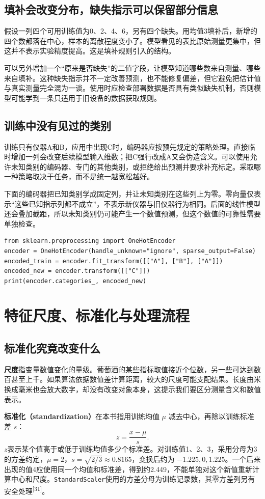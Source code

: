 \subsection{填补会改变分布，缺失指示可以保留部分信息}
假设一列四个可用训练值为0、2、4、6，另有四个缺失。用均值3填补后，新增的四个数都落在中心，样本的离散程度变小了。模型看见的表比原始测量更集中，但这并不表示实验精度提高。这是填补规则引入的结构。

可以另外增加一个“原来是否缺失”的二值字段，让模型知道哪些数来自测量、哪些来自填补。这种缺失指示并不一定改善预测，也不能修复偏差，但它避免把估计值与真实测量完全混为一谈。使用时应检查部署数据是否具有类似缺失机制，否则模型可能学到一条只适用于旧设备的数据获取规则。

\subsection{训练中没有见过的类别}
训练只有仪器A和B，应用中出现C时，编码器应按预先规定的策略处理。直接临时增加一列会改变后续模型输入维数；把C强行改成A又会伪造含义。可以使用允许未知类别的编码器、专门的其他类别，或拒绝给出预测并要求补充标定。采取哪一种策略取决于任务，而不是统一越宽松越好。

下面的编码器把已知类别学成固定列，并让未知类别在这些列上为零。零向量仅表示“这些已知指示列都不成立”，不表示新仪器与旧仪器行为相同。后面的线性模型还会叠加截距，所以未知类别仍可能产生一个数值预测，但这个数值的可靠性需要单独检查。
\begin{lstlisting}
from sklearn.preprocessing import OneHotEncoder
encoder = OneHotEncoder(handle_unknown="ignore", sparse_output=False)
encoded_train = encoder.fit_transform([["A"], ["B"], ["A"]])
encoded_new = encoder.transform([["C"]])
print(encoder.categories_, encoded_new)
\end{lstlisting}

\section{特征尺度、标准化与处理流程}
\label{sec:standardization}
\subsection{标准化究竟改变什么}
\textbf{尺度}指变量数值变化的量级。葡萄酒的某些指标取值接近个位数，另一些可达到数百甚至上千。如果算法依据数值差计算距离，较大的尺度可能支配结果。长度由米换成毫米也会放大数字，却没有改变对象本身，这提示我们要区分测量含义和数值表示。

\textbf{标准化（standardization）}在本书指用训练均值 $\mu$ 减去中心，再除以训练标准差 $s$：
\[
z=\frac{x-\mu}{s}.
\]
$z$表示某个值高于或低于训练均值多少个标准差。对训练值1、2、3，采用分母为3的方差约定，$\mu=2$，$s=\sqrt{2/3}\approx0.8165$，变换后约为 $-1.225,0,1.225$。一个后来出现的值4应使用同一个均值和标准差，得到约2.449，不能单独对这个新值重新计算中心和尺度。\texttt{StandardScaler}使用的方差分母为训练记录数，其零方差列另有安全处理\textsuperscript{[31]}。

